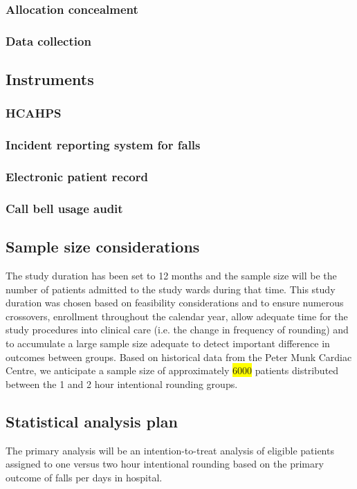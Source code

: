 \documentclass[12pt]{article}
\begin{document}
\subsubsection{Allocation concealment}

\subsubsection{Data collection}

\subsection{Instruments}

\subsubsection{HCAHPS}
\subsubsection{Incident reporting system for falls}
\subsubsection{Electronic patient record}
\subsubsection{Call bell usage audit}

\subsection{Sample size considerations}
The study duration has been set to 12 months and the sample size will be the number of patients admitted to the study wards during that time. This study duration was chosen based on feasibility considerations and to ensure numerous crossovers, enrollment throughout the calendar year, allow adequate time for the study procedures into clinical care (i.e. the change in frequency of rounding) and to accumulate a large sample size adequate to detect important difference in outcomes between groups. Based on historical data from the Peter Munk Cardiac Centre, we anticipate a sample size of approximately \colorbox{yellow}{6000} patients distributed between the 1 and 2 hour intentional rounding groups.


\subsection{Statistical analysis plan}
 The primary analysis will be an intention-to-treat analysis of eligible patients assigned to one versus two hour intentional rounding based on the primary outcome of falls per days in hospital. 
\end{document}
